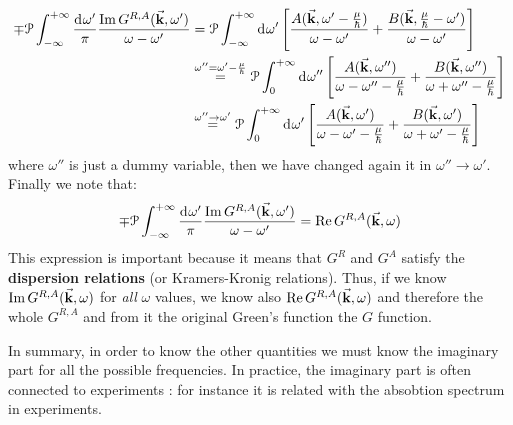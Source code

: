 \documentclass[../main/main.tex]{subfiles}
\begin{document}
\begin{equation*}
\begin{split}
  \mp \mathcal{P} \int_{- \infty }^{+ \infty } \frac{\dd[]{\omega'} }{\pi } \frac{\Im G^{R,A} (\va{k}, \omega')}{\omega - \omega'}
  &=
  \mathcal{P} \int_{- \infty }^{+ \infty } \dd[]{\omega'}  \qty[ \frac{ A (\va{k}, \omega' - \frac{\mu }{\hbar })}{\omega - \omega'}  +
  \frac{ B (\va{k}, \frac{\mu }{\hbar } - \omega' ) }{\omega - \omega'}
  ]  \\
  & \overset{\omega''= \omega' - \frac{\mu }{\hbar }}{=}
  \mathcal{P} \int_{0 }^{+ \infty } \dd[]{\omega''}  \qty[ \frac{ A (\va{k}, \omega'')}{\omega - \omega'' - \frac{\mu }{\hbar }}  +
  \frac{ B (\va{k},  \omega'' ) }{\omega + \omega'' - \frac{\mu }{\hbar }}
  ] \\
  & \overset{\omega'' \rightarrow \omega'}{=}
  \mathcal{P} \int_{0 }^{+ \infty } \dd[]{\omega'}  \qty[ \frac{ A (\va{k}, \omega')}{\omega - \omega' - \frac{\mu }{\hbar }}  +
  \frac{ B (\va{k},  \omega' ) }{\omega + \omega' - \frac{\mu }{\hbar }}
  ]
\end{split}
\end{equation*}
where \( \omega'' \) is just a dummy variable, then we have changed again it in \( \omega'' \rightarrow \omega' \).
Finally we note that: 
\begin{equation}
  \mp \mathcal{P} \int_{- \infty }^{+ \infty } \frac{ \dd[]{\omega'}}{  \pi } \frac{\Im G^{R,A} (\va{k}, \omega')}{\omega - \omega'}
  = \Re  G^{R,A} (\va{k}, \omega)
  \label{eq:10_10}
\end{equation}
This expression is important because it means that  \( G^R \) and \( G^A \) satisfy the \textbf{dispersion relations} (or Kramers-Kronig relations).
Thus, if we know \( \Im G^{R,A} (\va{k}, \omega ) \) for \emph{all} \( \omega  \) values, we know also \( \Re G^{R,A} (\va{k}, \omega ) \) and therefore the whole \( G^{R,A} \) and  from it the original Green's function the \( G \) function.


In summary, in order to know the other quantities we must know the imaginary part for all the possible frequencies. In practice, the imaginary part is often connected to experiments : for instance it is related with the absobtion spectrum in experiments.
\end{document}
